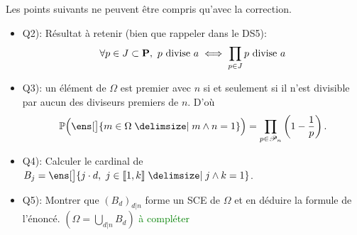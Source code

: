 Les points suivants ne peuvent être compris qu'avec la correction.
\begin{itemize}
    \item Q2): Résultat à retenir (bien que rappeler dans le DS5):\\
    $$\forall p \in J \subset \P,\ p \text{ divise } a \iff \prod_{p \in J} p \text{ divise } a$$
    \item Q3): un élément de $\Omega$ est premier avec $n$ si et seulement si il n'est divisible par aucun des diviseurs premiers de $n$. D'où
    $$\mathbb{P} \Big(\ens[\big]{ m \in \Omega \tq m \wedge n = 1} \Big) = \prod_{p \in \mathscr{P}_n} \left(1 - \frac{1}{p} \right).$$
    \item Q4): Calculer le cardinal de $B_j = \ens[\big]{ j\cdot d,\ j \in \llbracket 1, k \rrbracket \tq j \wedge k = 1}$.
    \item Q5): Montrer que $(B_d)_{d|n}$ forme un SCE de $\Omega$ et en déduire la formule de l'énoncé. $\displaystyle (\Omega = \bigcup_{d|n} B_d)$ \textcolor{green}{à compléter}
\end{itemize}